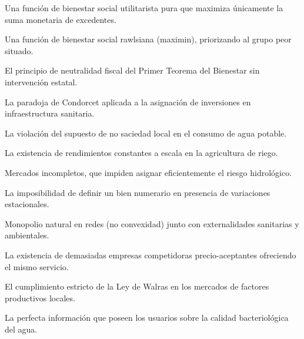 \begin{opts}
    \item Una función de bienestar social utilitarista pura que maximiza únicamente la suma monetaria de excedentes.
    \item Una función de bienestar social rawlsiana (maximin), priorizando al grupo peor situado.
    \item El principio de neutralidad fiscal del Primer Teorema del Bienestar sin intervención estatal.
    \item La paradoja de Condorcet aplicada a la asignación de inversiones en infraestructura sanitaria.
\end{opts}

\begin{opts}
    \item La violación del supuesto de no saciedad local en el consumo de agua potable.
    \item La existencia de rendimientos constantes a escala en la agricultura de riego.
    \item Mercados incompletos, que impiden asignar eficientemente el riesgo hidrológico.
    \item La imposibilidad de definir un bien numerario en presencia de variaciones estacionales.
\end{opts}

\begin{opts}
    \item Monopolio natural en redes (no convexidad) junto con externalidades sanitarias y ambientales.
    \item La existencia de demasiadas empresas competidoras precio-aceptantes ofreciendo el mismo servicio.
    \item El cumplimiento estricto de la Ley de Walras en los mercados de factores productivos locales.
    \item La perfecta información que poseen los usuarios sobre la calidad bacteriológica del agua.
\end{opts}

